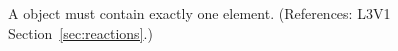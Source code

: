 A \KineticLaw object must contain exactly one  element.
(References: L3V1 Section~\ref{sec:reactions}.)
